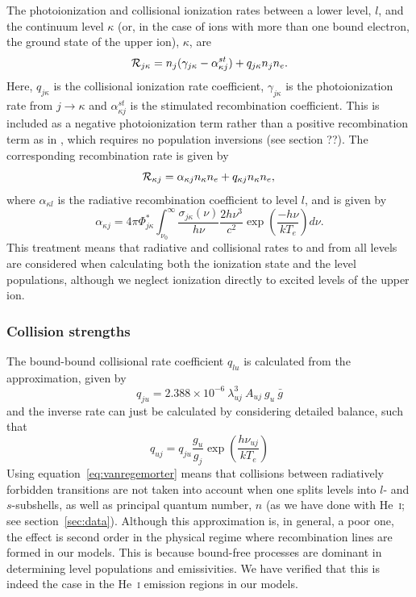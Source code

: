 The photoionization and collisional ionization rates
between a lower level, $l$, and the continuum level $\kappa$ 
(or, in the case of ions with more than one bound electron, 
the ground state of the upper ion),
$\kappa$, are
\begin{equation}
{\cal R}_{j \kappa}= n_j (\gamma_{j\kappa} - \alpha^{st}_{\kappa j})  + q_{j \kappa} n_j n_e.
\end{equation}
Here, $q_{j \kappa}$ is the collisional ionization rate coefficient, 
$\gamma_{j \kappa}$ is the photoionization rate
from $j \rightarrow \kappa$ and $\alpha^{st}_{\kappa j}$ is the stimulated recombination
coefficient. This is included as a negative photoionization term rather 
than a positive recombination term as in \cite{lucy2003}, which requires no
population inversions (see section ??). 
The corresponding recombination rate is given by 
\begin{equation}
{\cal R}_{\kappa j} = \alpha_{\kappa j} n_{\kappa} n_e + q_{\kappa j}
n_\kappa n_e, \\
\end{equation}
where $\alpha_{\kappa l}$ is the radiative recombination coefficient
to level $l$, and is given by 
\begin{equation}
\alpha_{\kappa j} = 4\pi \Phi^*_{j\kappa} \int^\infty_{\nu_0} 
\frac{\sigma_{j\kappa} (\nu)}{h \nu} \frac{2 h \nu^3}{c^2} 
\exp \left( \frac{- h \nu}{k T_e} \right) d\nu.
\end{equation}
This treatment means that radiative and collisional
rates to and from all levels are considered when calculating both the
ionization state and the level populations, although we neglect 
ionization directly to excited levels of the upper ion. 

\subsubsection{Collision strengths}
\label{sec:coll}

The bound-bound collisional rate coefficient $q_{lu}$ is calculated from the
\cite{vanregemorter} approximation, given by
\begin{equation}
q_{ju} = 2.388 \times 10^{-6}~\lambda_{uj}^3~A_{uj}~g_u~\bar{g}
\label{eq:vanregemorter}
\end{equation}
and the inverse rate can just be calculated by considering detailed balance, 
such that
\begin{equation}
q_{uj} = q_{ju} \frac{g_u}{g_j} \exp \left( \frac{h \nu_{uj}}{k T_e} \right)
\label{eq:vanregemorterw}
\end{equation}
Using equation~\ref{eq:vanregemorter} means that collisions between radiatively
forbidden transitions are not taken into account when one 
splits levels into $l$- and $s$-subshells, as well
as principal quantum number, $n$ (as we have done with He~\textsc{i}; 
see section~\ref{sec:data}). Although this approximation is, in general, 
a poor one, the effect is second order in the physical 
regime where recombination lines are formed in our models. 
This is because bound-free processes are dominant in determining 
level populations and emissivities. We have verified that this 
is indeed the case in the He~\textsc{i} emission regions in our models.

